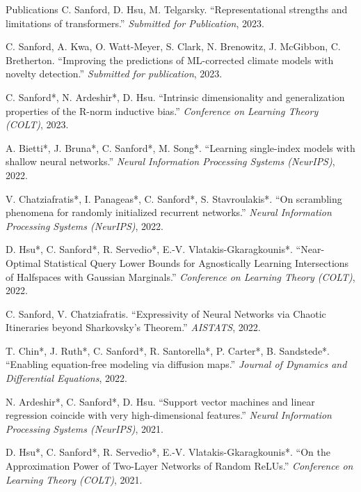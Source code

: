 \documentclass{cv} %
\begin{document}
\begin{rSection}{Publications}
C. Sanford, D. Hsu, M. Telgarsky. ``Representational strengths and limitations of transformers.'' \textit{Submitted for Publication}, 2023.

C. Sanford, A. Kwa, O. Watt-Meyer, S. Clark, N. Brenowitz, J. McGibbon, C. Bretherton. ``Improving the predictions of ML-corrected climate models with novelty detection.'' \textit{Submitted for publication}, 2023.

C. Sanford*, N. Ardeshir*, D. Hsu. ``Intrinsic dimensionality and generalization properties of the R-norm inductive bias.'' \textit{Conference on Learning Theory (COLT)}, 2023.

A. Bietti*, J. Bruna*, C. Sanford*, M. Song*. ``Learning single-index models with shallow neural networks.'' \textit{Neural Information Processing Systems (NeurIPS)}, 2022.

V. Chatziafratis*, I. Panageas*, C. Sanford*, S. Stavroulakis*. ``On scrambling phenomena for randomly initialized recurrent networks.'' \textit{Neural Information Processing Systems (NeurIPS)}, 2022.

D. Hsu*, C. Sanford*, R. Servedio*, E.-V. Vlatakis-Gkaragkounis*. ``Near-Optimal Statistical Query Lower Bounds for Agnostically Learning Intersections of Halfspaces with Gaussian Marginals.'' \textit{Conference on Learning Theory (COLT)}, 2022.

C. Sanford, V. Chatziafratis. ``Expressivity of Neural Networks via Chaotic Itineraries beyond Sharkovsky's Theorem.'' \textit{AISTATS}, 2022.

T. Chin*, J. Ruth*, C. Sanford*, R. Santorella*, P. Carter*, B. Sandstede*. ``Enabling equation-free modeling via diffusion maps.'' \textit{Journal of Dynamics and Differential Equations}, 2022.


N. Ardeshir*, C. Sanford*, D. Hsu. ``Support vector machines and linear regression coincide with very high-dimensional features.'' \textit{Neural Information Processing Systems (NeurIPS)}, 2021.


D. Hsu*, C. Sanford*, R. Servedio*, E.-V. Vlatakis-Gkaragkounis*. ``On the Approximation Power of Two-Layer Networks of Random ReLUs.'' \textit{Conference on Learning Theory (COLT)}, 2021.




\end{rSection}
\end{document}
